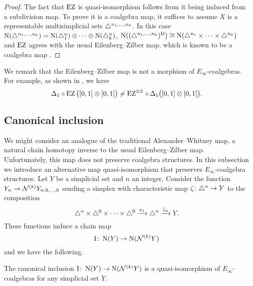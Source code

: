 \begin{proof}
	The fact that $\operatorname{EZ}$ is quasi-isomorphism follows from it being induced from a subdivision map.
	To prove it is a coalgebra map, it suffices to assume $X$ is a representable multisimplicial sets $\triangle^{n_1,\dots,n_k}$.
	In this case $\operatorname{N}(\triangle^{n_1,\dots,n_k}) = \operatorname{N}(\triangle^n_1) \otimes\dotsb\otimes \operatorname{N}(\triangle^n_k)$, $\operatorname{N}((\triangle^{n_1,\dots,n_k})^{\mathrm{D}}) \cong \operatorname{N}(\triangle^{n_1}\times\dots\times\triangle^{n_k})$ and $\operatorname{EZ}$ agrees with the usual Eilenberg--Zilber map, which is known to be a coalgebra map \cite[(17.6)]{eilenber1966coalgebras}.
\end{proof}

We remark that the Eilenberg--Zilber map is not a morphism of $E_\infty$-coalgebras.
For example, as shown in \cite[\S5.4]{medina2022cube_einfty}, we have
\[
\Delta_1 \circ \operatorname{EZ}\big([0,1] \otimes [0,1]\big) \neq
\operatorname{EZ} ^{\otimes 2}\, \circ \, \Delta_1\big([0,1] \otimes [0,1]\big).
\]

\subsection{Canonical inclusion}\label{ss:inclusion}

We might consider an analogue of the traditional Alexander--Whitney map, a natural chain homotopy inverse to the usual Eilenberg--Zilber map.
Unfortunately, this map does not preserve coalgebra structures.
In this subsection we introduce an alternative map quasi-isomorphism that preserves $E_\infty$-coalgebra structures.
Let $Y$ be a simplicial set and $n$ an integer.
Consider the function $Y_n \to \mathcal{N}^{(k)} Y_{n,0,\dots,0}$ sending a simplex with characteristic map $\zeta \colon \triangle^n \to Y$ to the composition
\[
\triangle^n \times \triangle^{0}\times\dots\times\triangle^{0} \xrightarrow{\pi_1} \triangle^n \xrightarrow{\zeta_y} Y.
\]
These functions induce a chain map
\[
\operatorname{I} \colon \operatorname{N}(Y) \to \operatorname{N}(\mathcal{N}^{(k)} Y)
\]
and we have the following.

\begin{theorem}
	The canonical inclusion $\operatorname{I} \colon \operatorname{N}(Y) \to \operatorname{N}(\mathcal{N}^{(k)} Y)$ is a quasi-isomorphism of $E_\infty$-coalgebras for any simplicial set $Y$.
\end{theorem}

